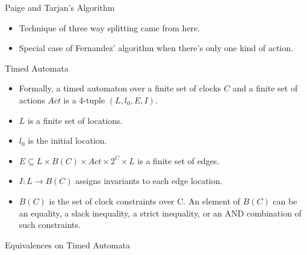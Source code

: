 \documentclass{beamer}
\begin{document}
\begin{frame}{Paige and Tarjan's Algorithm}
  \begin{itemize}
  \item Technique of three way splitting came from here.
  \item Special case of Fernandez' algorithm when there's only one
    kind of action.
  \end{itemize}
\end{frame}

\begin{frame}{Timed Automata}
  \begin{itemize}
  \item Formally, a timed automaton over a finite set of clocks $C$
    and a finite set of actions $Act$ is a 4-tuple $(L, l_{0}, E, I)$.
  \item $L$ is a finite set of locations.
  \item $l_{0}$ is the initial location.
  \item $E \subseteq L \times B(C) \times Act \times 2^{C} \times L$
    is a finite set of edges.
  \item $I: L \rightarrow B(C)$ assigns invariants to each edge
    location.
  \item $B(C)$ is the set of clock constraints over C. An element of $B(C)$
    can be an equality, a slack inequality, a strict inequality, or
    an AND combination of such constraints.
  \end{itemize}
\end{frame}

\begin{frame}{Equivalences on Timed Automata}



\end{frame}
\end{document}
